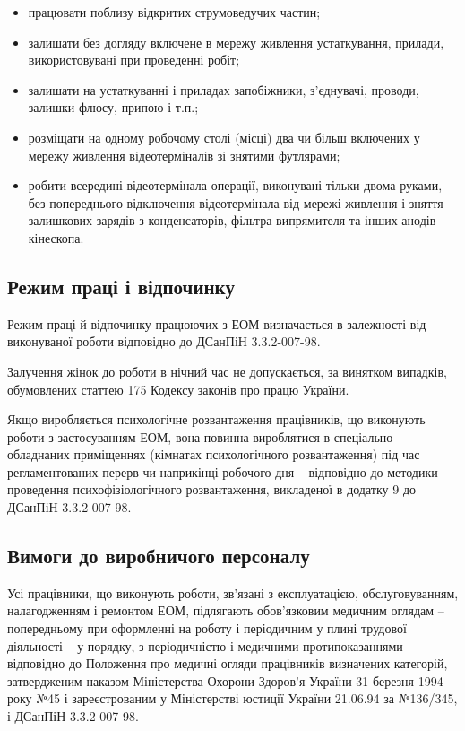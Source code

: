 \documentclass[simple,a4paper,14pt,ukrainian,utf8]{eskdtext}
\begin{document}
\begin{appendices}
                \begin{itemize}
                    \item працювати поблизу відкритих струмоведучих частин;
                    \item залишати без догляду включене в мережу живлення устаткування, прилади, використовувані при проведенні робіт;
                    \item залишати на устаткуванні і приладах запобіжники, з'єднувачі, проводи, залишки флюсу, припою і т.п.;
                    \item розміщати на одному робочому столі (місці) два чи більш включених у мережу живлення відеотерміналів зі знятими футлярами;
                    \item робити всередині відеотермінала операції, виконувані тільки двома руками, без попереднього відключення відеотермінала від мережі живлення і зняття залишкових зарядів з конденсаторів, фільтра-випрямителя та інших анодів кінескопа.
                \end{itemize}

            \subsection{Режим праці і відпочинку}

                Режим праці й відпочинку працюючих з ЕОМ визначається в залежності від виконуваної роботи відповідно до ДСанПіН 3.3.2-007-98.

                Залучення жінок до роботи в нічний час не допускається, за винятком випадків, обумовлених статтею 175 Кодексу законів про працю України.

                Якщо виробляється психологічне розвантаження працівників, що виконують роботи з застосуванням ЕОМ, вона повинна вироблятися в спеціально обладнаних приміщеннях (кімнатах психологічного розвантаження) під час регламентованих перерв чи наприкінці робочого дня -- відповідно до методики проведення психофізіологічного розвантаження, викладеної в додатку 9  до ДСанПіН 3.3.2-007-98.

            \subsection{Вимоги до виробничого персоналу}

                Усі працівники, що виконують роботи, зв'язані з експлуатацією, обслуговуванням, налагодженням і ремонтом ЕОМ, підлягають обов'язковим медичним оглядам -- попередньому при оформленні на роботу і періодичним у плині трудової діяльності -- у порядку, з періодичністю і медичними протипоказаннями відповідно до Положення про медичні огляди працівників визначених категорій, затвердженим наказом Міністерства Охорони Здоров'я України 31 березня 1994 року №45 і зареєстрованим у Міністерстві юстиції України 21.06.94 за №136/345, і ДСанПіН 3.3.2-007-98.


\end{appendices}
\end{document}
